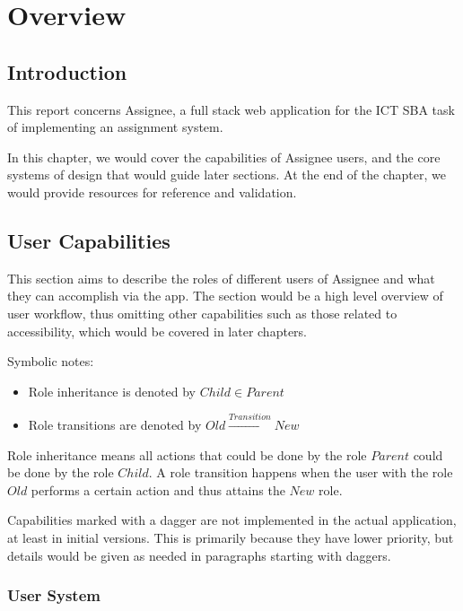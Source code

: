 \chapter{Overview}
\label{overview}

\section{Introduction}
\label{overview.intro}

This report concerns Assignee, a full stack web application for the ICT SBA task
of implementing an assignment system.

In this chapter, we would cover the capabilities of Assignee users, and the core
systems of design that would guide later sections. At the end of the chapter, we
would provide resources for reference and validation.

\section{User Capabilities}
\label{overview.capab}

This section aims to describe the roles of different users of Assignee and what they
can accomplish via the app. The section would be a high level overview of user
workflow, thus omitting other capabilities such as those related to accessibility,
which would be covered in later chapters.

Symbolic notes:
\begin{itemize}
	\item Role inheritance is denoted by $Child\in{}Parent$

	\item Role transitions are denoted by $Old\xrightarrow{Transition}New$
\end{itemize}

Role inheritance means all actions that could be done by the role $Parent$ could
be done by the role $Child$. A role transition happens when the user with the role
$Old$ performs a certain action and thus attains the $New$ role.

Capabilities marked with a dagger \textdagger{} are not implemented in the
actual application, at least in initial versions. This is primarily because they
have lower priority, but details would be given as needed in paragraphs starting
with daggers.

\subsection{User System}
\label{overview.capab.user}

